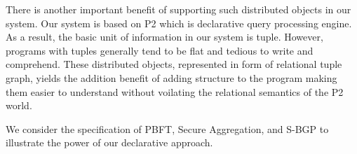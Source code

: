 There is another important benefit of supporting such distributed objects in our system. Our system is based on P2 which is declarative query processing engine. As a result, the basic unit of information in our system is tuple. However, programs with tuples generally tend to be flat and tedious to write and comprehend. These distributed objects, represented in form of relational tuple graph, yields the addition benefit of adding structure to the program making them easier to understand without voilating the relational semantics of the P2 world.

We consider the specification of PBFT, Secure Aggregation, and S-BGP to illustrate the power of our declarative approach. 